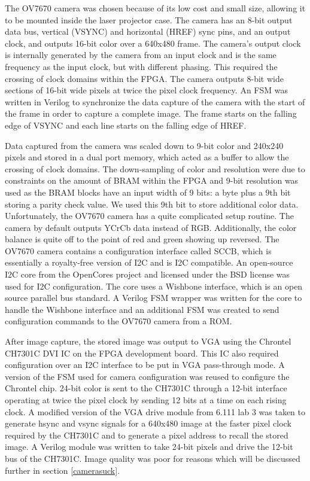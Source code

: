 \documentclass{article}
\begin{document}
The OV7670 camera was chosen because of its low cost and small size, allowing it to be mounted inside the laser projector case. The camera has an 8-bit output data bus, vertical (VSYNC) and horizontal (HREF) sync pins, and an output clock, and outputs 16-bit color over a 640x480 frame. The camera's output clock is internally generated by the camera from an input clock and is the same frequency as the input clock, but with different phasing. This required the crossing of clock domains within the FPGA. The camera outputs 8-bit wide sections of 16-bit wide pixels at twice the pixel clock frequency. An FSM was written in Verilog to synchronize the data capture of the camera with the start of the frame in order to capture a complete image. The frame starts on the falling edge of VSYNC and each line starts on the falling edge of HREF.

 Data captured from the camera was scaled down to 9-bit color and 240x240 pixels and stored in a dual port memory, which acted as a buffer to allow the crossing of clock domains. The down-sampling of color and resolution were due to constraints on the amount of BRAM within the FPGA and 9-bit resolution was used as the BRAM blocks have an input width of 9 bits: a byte plus a 9th bit storing a parity check value. We used this 9th bit to store additional color data. 
Unfortunately, the OV7670 camera has a quite complicated setup routine. The camera by default outputs YCrCb data instead of RGB. Additionally, the color balance is quite off to the point of red and green showing up reversed. The OV7670 camera contains a configuration interface called SCCB, which is essentially a royalty-free version of I2C and is I2C compatible. An open-source I2C core from the OpenCores project and licensed under the BSD license was used for I2C configuration. The core uses a Wishbone interface, which is an open source parallel bus standard. A Verilog FSM wrapper was written for the core to handle the Wishbone interface and an additional FSM was created to send configuration commands to the OV7670 camera from a ROM.

After image capture, the stored image was output to VGA using the Chrontel CH7301C DVI IC on the FPGA development board. This IC also required configuration over an I2C interface to be put in VGA pass-through mode. A version of the FSM used for camera configuration was reused to configure the Chrontel chip. 24-bit color is sent to the CH7301C through a 12-bit interface operating at twice the pixel clock by sending 12 bits at a time on each rising clock. A modified version of the VGA drive module from 6.111 lab 3 was taken to generate hsync and vsync signals for a 640x480 image at the faster pixel clock required by the CH7301C and to generate a pixel address to recall the stored image. A Verilog module was written to take 24-bit pixels and drive the 12-bit bus of the CH7301C. Image quality was poor for reasons which will be discussed further in section \ref{camerasuck}.
\end{document}
